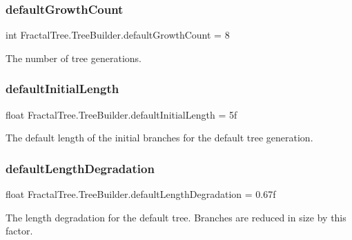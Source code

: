 \subsubsection{\texorpdfstring{default\+Growth\+Count}{defaultGrowthCount}}
{\footnotesize\ttfamily int Fractal\+Tree.\+Tree\+Builder.\+default\+Growth\+Count = 8}



The number of tree generations. 

\hypertarget{class_fractal_tree_1_1_tree_builder_a34195cdf1a552ee1027bfbf42682ea29}{}\label{class_fractal_tree_1_1_tree_builder_a34195cdf1a552ee1027bfbf42682ea29} 
\subsubsection{\texorpdfstring{default\+Initial\+Length}{defaultInitialLength}}
{\footnotesize\ttfamily float Fractal\+Tree.\+Tree\+Builder.\+default\+Initial\+Length = 5f}



The default length of the initial branches for the default tree generation. 

\hypertarget{class_fractal_tree_1_1_tree_builder_aab288ec80d45e50e41a31ca3313e44be}{}\label{class_fractal_tree_1_1_tree_builder_aab288ec80d45e50e41a31ca3313e44be} 
\subsubsection{\texorpdfstring{default\+Length\+Degradation}{defaultLengthDegradation}}
{\footnotesize\ttfamily float Fractal\+Tree.\+Tree\+Builder.\+default\+Length\+Degradation = 0.\+67f}



The length degradation for the default tree. Branches are reduced in size by this factor. 

\hypertarget{class_fractal_tree_1_1_tree_builder_a1f60a72d865f9cca5bb155a72ff5f6ef}{}\label{class_fractal_tree_1_1_tree_builder_a1f60a72d865f9cca5bb155a72ff5f6ef} 
